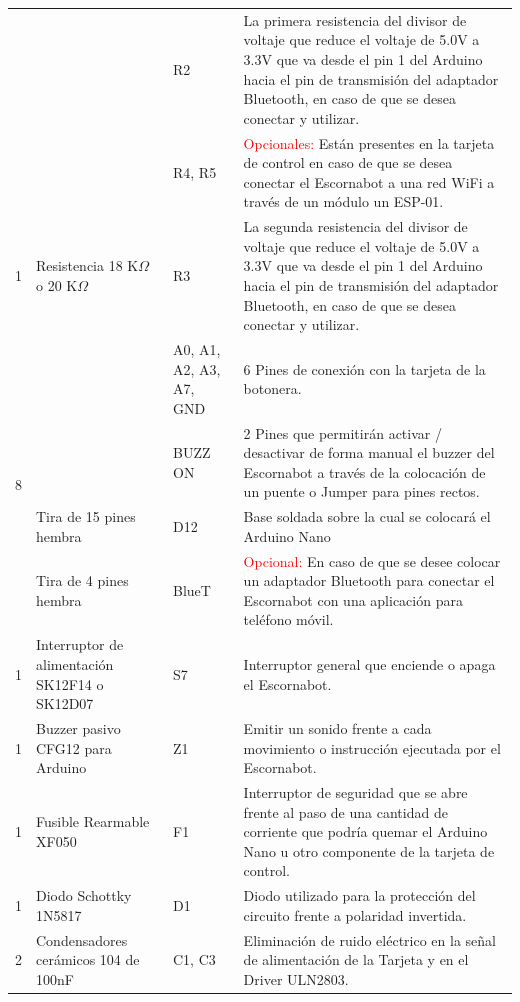 \documentclass{article}
\begin{document}
\begin{longtable}{|c|>{\raggedright}m{}|>{\centering}m{}|m{}|}
    \\ \cline{3-4}
    &  & R2 & La primera resistencia del divisor de voltaje que reduce el voltaje de 5.0V a 3.3V que va desde el pin 1 del Arduino hacia el pin de transmisión del adaptador Bluetooth, en caso de que se desea conectar y utilizar. 
    \\ \cline{3-4}
    &  & R4, R5 & \textcolor{red}{Opcionales:} Están presentes en la tarjeta de control en caso de que se desea conectar el Escornabot a una red WiFi a través de un módulo un ESP-01.  
    \\ \hline
    1 & Resistencia 18 K$\Omega$ o 20 K$\Omega$ & R3 & La segunda resistencia del divisor de voltaje que reduce el voltaje de 5.0V a 3.3V que va desde el pin 1 del Arduino hacia el pin de transmisión del adaptador Bluetooth, en caso de que se desea conectar y utilizar. 
    \\ \hline
    \multirow{4}{*}{8} & \multirow{4}{0.15\textwidth}{Pines / headers macho rectos} & A0, A1, A2, A3, A7, GND & 6 Pines de conexión con la tarjeta de la botonera. \\ \cline{3-4}
    & & BUZZ ON & 2 Pines que permitirán activar / desactivar de forma manual el buzzer del Escornabot a través de la colocación de un puente o Jumper para pines rectos.
    \\ \hline
    2 & Tira de 15 pines hembra & D12 & Base soldada sobre la cual se colocará el Arduino Nano
    \\ \hline
    1 & Tira de 4 pines hembra & BlueT & \textcolor{red}{Opcional:} En caso de que se desee colocar un adaptador Bluetooth para conectar el Escornabot con una aplicación para teléfono móvil.
    \\ \hline
    1 & Interruptor de alimentación SK12F14 o SK12D07 & S7 & Interruptor general que enciende o apaga el Escornabot.
    \\ \hline
    1 & Buzzer pasivo CFG12 para Arduino & Z1 & Emitir un sonido frente a cada movimiento o instrucción ejecutada por el Escornabot.
    \\ \hline
    1 & Fusible Rearmable XF050 & F1 & Interruptor de seguridad que se abre frente al paso de una cantidad de corriente que podría quemar el Arduino Nano u otro componente de la tarjeta de control.
    \\ \hline
    1 & Diodo Schottky 1N5817 & D1 & Diodo utilizado para la protección del circuito frente a polaridad invertida.
    \\ \hline
    2 & Condensadores cerámicos 104 de 100nF & C1, C3 & Eliminación de ruido eléctrico en la señal de alimentación de la Tarjeta y en el Driver ULN2803.
    \\ \hline
\end{longtable}
\end{document}
